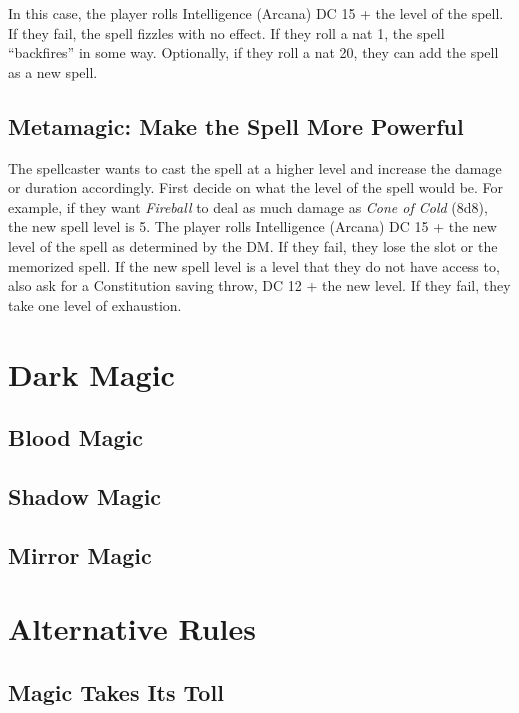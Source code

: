 \documentclass[twocolumn]{dndbook}
\begin{document}
In this case, the player rolls Intelligence (Arcana) DC 15 + the level of the spell.
If they fail, the spell fizzles with no effect.
If they roll a nat 1, the spell ``backfires'' in some way.
Optionally, if they roll a nat 20, they can add the spell as a new spell.\par


\subsection{Metamagic: Make the Spell More Powerful}
The spellcaster wants to cast the spell at a higher level and increase the damage or duration accordingly.
First decide on what the level of the spell would be. For example, if they want \emph{Fireball} to deal as much damage as \emph{Cone of Cold} (8d8), the new spell level is 5.
The player rolls Intelligence (Arcana) DC 15 + the new level of the spell as determined by the DM.
If they fail, they lose the slot or the memorized spell.
If the new spell level is a level that they do not have access to, also ask for a Constitution saving throw, DC 12 + the new level.
If they fail, they take one level of exhaustion.



\section{Dark Magic}

\subsection{Blood Magic}

\subsection{Shadow Magic}

\subsection{Mirror Magic}

\section{Alternative Rules}

\subsection{Magic Takes Its Toll}
\end{document}
